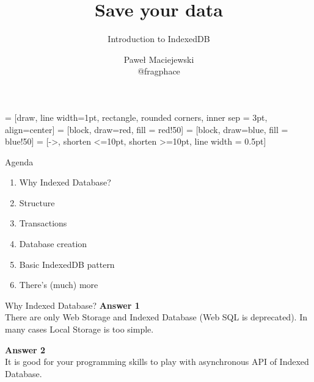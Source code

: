 \documentclass[xetex]{beamer}
\title{Save your data}
\subtitle{Introduction to IndexedDB}
\author{
    Paweł Maciejewski\\
    @fragphace
}
\date{}
\begin{document}
     = [draw, line width=1pt, rectangle, rounded corners, inner sep = 3pt, align=center]
     = [block, draw=red, fill = red!50]
     = [block, draw=blue, fill = blue!50]
     = [->, shorten <=10pt, shorten >=10pt, line width = 0.5pt]

    \begin{frame}[plain] 
      \titlepage
      \vspace{-2cm} 
    \end{frame}    
    
    \begin{frame}{Agenda}    

        \begin{enumerate}
          \item Why Indexed Database?
          \item Structure
          \item Transactions
          \item Database creation
          \item Basic IndexedDB pattern
          \item There's (much) more
        \end{enumerate}     
        
    \end{frame}

    \begin{frame}[containsverbatim]{Why Indexed Database?}
      \textbf{Answer 1}\\
      There are only Web Storage and Indexed Database (Web SQL is deprecated).
      In many cases Local Storage is too simple.

      \vspace{20pt}

      \textbf{Answer 2}\\
      It is good for your programming skills to play with asynchronous API of Indexed Database.
    \end{frame}
\end{document}
